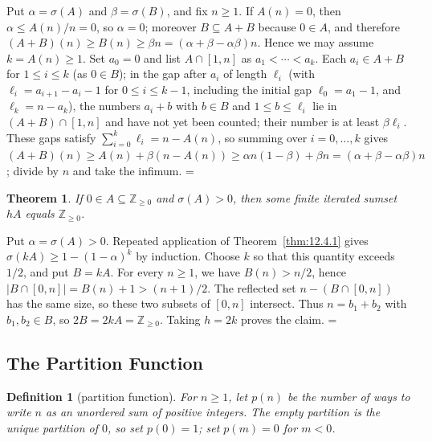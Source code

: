 \documentclass[11pt]{article}
\makeatletter
\let\nt@closedisplay\]
\def\nt@guardedclose{\@ifnextchar\par{\nt@closeafterpar}{\@ifnextchar\end{\postdisplaypenalty\@M\nt@closedisplay}{\nt@closedisplay}}}
\def\nt@closeafterpar\par{\@ifnextchar\par{\nt@closeafterpar}{\@ifnextchar\end{\postdisplaypenalty\@M\nt@closedisplay\par}{\nt@closedisplay\par}}}
\renewenvironment{proof}[1][\proofname]{\par
  \pushQED{\qed}\normalfont\topsep\medskipamount\edef\nt@afterproof{\@endparpenalty=\the\@endparpenalty\relax}\@beginparpenalty\@M\@endparpenalty\@M\let\]\nt@guardedclose\trivlist\item[]\textit{#1\@addpunct{.}} \ignorespaces}{\ifvmode\addpenalty\@M\fi\popQED\nt@afterproof\endtrivlist\@endpefalse}
\theoremstyle{ntstyle}
\newtheorem{theorem}{Theorem}[subsection]
\newtheorem{definition}{Definition}[subsection]
\makeatother
\begin{document}
\begin{proof} Put $\alpha=\sigma(A)$ and
  $\beta=\sigma(B)$, and fix $n\ge1$. If $A(n)=0$, then
  $\alpha\le A(n)/n=0$, so $\alpha=0$; moreover $B\subseteq A+B$
  because $0\in A$, and therefore
  $(A+B)(n)\ge B(n)\ge\beta n=(\alpha+\beta-\alpha\beta)n$.
  Hence we may assume $k=A(n)\ge1$. Set $a_0=0$ and list
  $A\cap[1,n]$ as $a_1<\cdots<a_k$. Each
  $a_i\in A+B$ for $1\le i\le k$ (as $0\in B$); in the gap after $a_i$ of length
  $\ell_i$ (with $\ell_i=a_{i+1}-a_i-1$ for $0\le i\le k-1$, including
  the initial gap $\ell_0=a_1-1$, and $\ell_k=n-a_k$), the numbers $a_i+b$ with $b\in B$ and $1\le b\le\ell_i$ lie
  in $(A+B)\cap[1,n]$ and have not yet been counted; their number is
  at least $\beta\ell_i$. These gaps satisfy
  $\sum_{i=0}^{k}\ell_i=n-A(n)$, so summing over $i=0,\ldots,k$ gives
  $(A+B)(n)\ge A(n)+\beta(n-A(n))\ge\alpha n(1-\beta)+\beta n=(\alpha+\beta-\alpha\beta)n$; divide by $n$ and
  take the infimum.
\end{proof}

\begin{theorem}\label{thm:12.4.2}
  If $0\in A\subseteq\mathbb{Z}_{\ge0}$ and $\sigma(A)>0$, then some
  finite iterated sumset $hA$ equals $\mathbb{Z}_{\ge0}$.

\end{theorem}

\begin{proof} Put $\alpha=\sigma(A)>0$. Repeated
  application of Theorem~\ref{thm:12.4.1} gives $\sigma(kA)\ge1-(1-\alpha)^k$ by
  induction. Choose $k$ so that this quantity exceeds $1/2$, and put
  $B=kA$. For every $n\ge1$, we have $B(n)>n/2$, hence
  $|B\cap[0,n]|=B(n)+1>(n+1)/2$. The reflected set $n-(B\cap[0,n])$
  has the same size, so these two subsets of $[0,n]$ intersect. Thus $n=b_1+b_2$ with
  $b_1,b_2\in B$, so $2B=2kA=\mathbb{Z}_{\ge0}$. Taking $h=2k$ proves
  the claim.
\end{proof}
\subsection{The Partition Function}

\begin{definition}[partition function]\label{def:12.5.1}\label{def:partition-function}
  For
  $n\ge1$, let $p(n)$ be the number of ways to write $n$ as an unordered
  sum of positive integers. The empty partition is the unique partition
  of $0$, so set $p(0)=1$; set $p(m)=0$ for $m<0$.

\end{definition}
\end{document}
